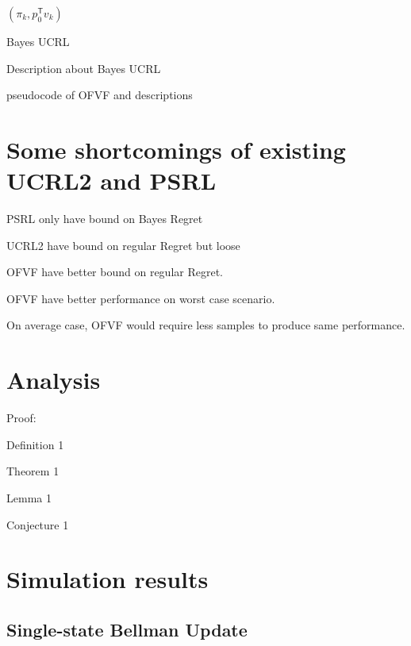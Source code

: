 \documentclass{article}
\newcommand{\tr}{^{\mathsf{T}}}
\begin{document}
\begin{algorithm}[H]
	 \Return $(\pi_k, p_0\tr v_k)$ \;
	 \caption{Bayes UCRL}    \label{alg:IAVF}
\end{algorithm} 

Description about Bayes UCRL

pseudocode of OFVF and descriptions

\section{Some shortcomings of existing UCRL2 and PSRL}

PSRL only have bound on Bayes Regret

UCRL2 have bound on regular Regret but loose

OFVF have better bound on regular Regret.

OFVF have better performance on worst case scenario.

On average case, OFVF would require less samples to produce same
performance.


\section{Analysis}

Proof:

Definition 1

Theorem 1

Lemma 1

Conjecture 1

\section{Simulation results}

\subsection{Single-state Bellman Update}
\end{document}
